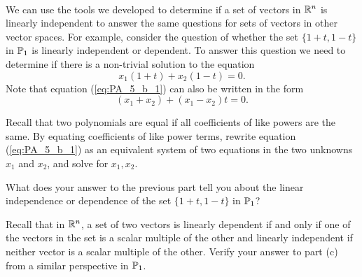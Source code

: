 \begin{pa} \label{pa:5_b}  ~
\be
\item We can use the tools we developed to determine if a set of vectors in $\mathbb{R}^n$ is linearly independent to answer the same questions for sets of vectors in other vector spaces. For example, consider the question of whether the set $\{1+t, 1-t\}$ in $\mathbb{P}_1$ is linearly independent or dependent. To answer this question we need to determine if there is a non-trivial solution to the equation
\begin{equation} \label{eq:PA_5_b_1}
x_1 (1+t) + x_2(1-t) = 0.
\end{equation}
Note that equation (\ref{eq:PA_5_b_1}) can also be written in the form
\[(x_1+x_2) + (x_1-x_2)t = 0.\]
	\ba
	\item Recall that two polynomials are equal if all coefficients of like powers are the same. By equating coefficients of like power terms, rewrite equation (\ref{eq:PA_5_b_1}) as an equivalent system of two equations in the two unknowns $x_1$ and $x_2$, and solve for $x_1, x_2$. 

	
	
	\item What does your answer to the previous part tell you about the linear independence or dependence of the set $\{1+t, 1-t\}$ in $\mathbb{P}_1$?

\item Recall that in $\mathbb{R}^n$, a set of two vectors is linearly dependent if and only if one of the vectors in the set is a scalar multiple of the other and linearly independent if neither vector is a scalar multiple of the other. Verify your answer to part (c) from a similar perspective in $\mathbb{P}_1$.

	\ea


\end{pa}
